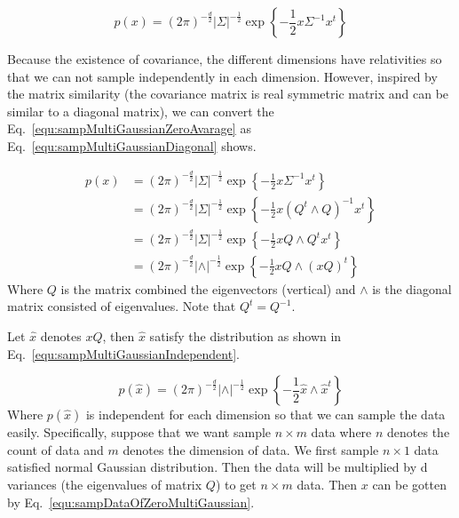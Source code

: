 \documentclass[runningheads,openany]{xhlPaper}
\begin{document}
\begin{equation}
\label{equ:sampMultiGaussianZeroAvarage}
p\left( x \right) = {\left( {2\pi } \right)^{ - \frac{d}{2}}}| \Sigma |^{-\frac{1}{2}}\exp \left\{ { - \frac{1}{2}{x} {\Sigma ^{ - 1}}{{{x}}^t}} \right\}
\end{equation}

Because the existence of covariance, the different dimensions have relativities so that we can not sample independently in each dimension. However, inspired by the matrix similarity (the covariance matrix is real symmetric matrix and can be similar to a diagonal matrix), we can convert the Eq.~\ref{equ:sampMultiGaussianZeroAvarage} as Eq.~\ref{equ:sampMultiGaussianDiagonal} shows.

\begin{equation}
\label{equ:sampMultiGaussianDiagonal}
\begin{aligned}
p\left( x \right) &= {\left( {2\pi } \right)^{ - \frac{d}{2}}}| \Sigma |^{-\frac{1}{2}}\exp \left\{ { - \frac{1}{2}x{\Sigma ^{ - 1}}{x^t}} \right\}\\
 &= {\left( {2\pi } \right)^{ - \frac{d}{2}}}| \Sigma |^{-\frac{1}{2}}\exp \left\{ { - \frac{1}{2}x{{\left( {{Q^t} \wedge Q} \right)}^{ - 1}}{x^t}} \right\}\\
 &= {\left( {2\pi } \right)^{ - \frac{d}{2}}}| \Sigma |^{-\frac{1}{2}}\exp \left\{ { - \frac{1}{2}xQ \wedge {Q^t}{x^t}} \right\}\\
 &= {\left( {2\pi } \right)^{ - \frac{d}{2}}}| \wedge |^{-\frac{1}{2}}\exp \left\{ { - \frac{1}{2}xQ \wedge {{\left( {xQ} \right)}^t}} \right\}
\end{aligned}
\end{equation}
Where $Q$ is the matrix combined the eigenvectors (vertical) and $\wedge$ is the diagonal matrix consisted of eigenvalues. Note that $Q^t = Q^{-1}$.

Let $\hat{x}$ denotes $xQ$, then $\hat{x}$ satisfy the distribution as shown in Eq.~\ref{equ:sampMultiGaussianIndependent}.

\begin{equation}
\label{equ:sampMultiGaussianIndependent}
p\left( {\hat x} \right) = {\left( {2\pi } \right)^{ - \frac{d}{2}}}| \wedge |^{-\frac{1}{2}}\exp \left\{ { - \frac{1}{2}\hat x \wedge {{\hat x}^t}} \right\}
\end{equation}
Where $p\left(\hat{x}\right)$ is independent for each dimension so that we can sample the data easily. Specifically, suppose that we want sample $n \times m$ data where $n$ denotes the count of data and $m$ denotes the dimension of data. We first sample $n \times 1$ data satisfied normal Gaussian distribution. Then the data will be multiplied by d variances (the eigenvalues of matrix $Q$) to get $n \times m$ data.
Then $x$ can be gotten by Eq.~\ref{equ:sampDataOfZeroMultiGaussian}.
\end{document}
